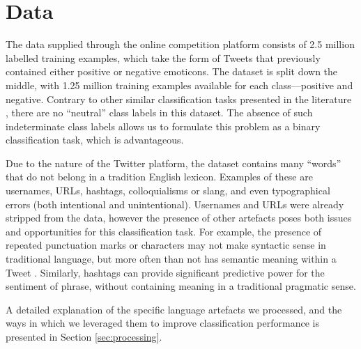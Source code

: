 \section{Data}
\label{sec:data}

The data supplied through the online competition platform consists of 2.5 million labelled training examples, which take the form of Tweets that previously contained either positive or negative emoticons. The dataset is split down the middle, with 1.25 million training examples available for each class---positive and negative. Contrary to other similar classification tasks presented in the literature \cite{jiang2011target, tang2014learning}, there are no ``neutral'' class labels in this dataset. The absence of such indeterminate class labels allows us to formulate this problem as a binary classification task, which is advantageous.

Due to the nature of the Twitter platform, the dataset contains many ``words'' that do not belong in a tradition English lexicon. Examples of these are usernames, URLs, hashtags, colloquialisms or slang, and even typographical errors (both intentional and unintentional). Usernames and URLs were already stripped from the data, however the presence of other artefacts poses both issues and opportunities for this classification task. For example, the presence of repeated punctuation marks or characters may not make syntactic sense in traditional language, but more often than not has semantic meaning within a Tweet \cite{tang2014learning}. Similarly, hashtags can provide significant predictive power for the sentiment of phrase, without containing meaning in a traditional pragmatic sense.

A detailed explanation of the specific language artefacts we processed, and the ways in which we leveraged them to improve classification performance is presented in Section \ref{sec:processing}.

